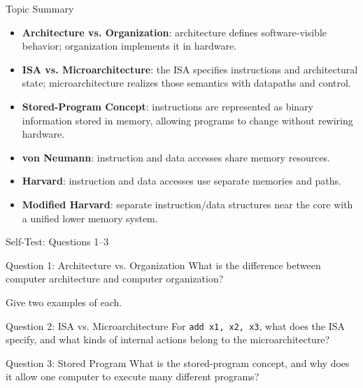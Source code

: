 \documentclass[aspectratio=169,11pt,t]{beamer}
\newcommand{\key}[1]{\textbf{#1}}
\newcommand{\code}[1]{\texttt{#1}}
\begin{document}
\begin{frame}{Topic Summary}

\begin{itemize}
  \item \key{Architecture vs. Organization}:
        architecture defines
        software-visible behavior;
        organization implements it
        in hardware.
  \item \key{ISA vs. Microarchitecture}:
        the ISA specifies instructions
        and architectural state;
        microarchitecture realizes
        those semantics
        with datapaths and control.
  \item \key{Stored-Program Concept}:
        instructions are represented
        as binary information
        stored in memory,
        allowing programs to change
        without rewiring hardware.
  \item \key{von Neumann}:
        instruction and data accesses
        share memory resources.
  \item \key{Harvard}:
        instruction and data accesses
        use separate memories and paths.
  \item \key{Modified Harvard}:
        separate instruction/data structures
        near the core
        with a unified lower memory system.
\end{itemize}

\end{frame}




\begin{frame}{Self-Test: Questions 1--3}

\begin{block}{Question 1: Architecture vs. Organization}
What is the difference
between computer architecture
and computer organization?

Give two examples of each.
\end{block}

\vspace{0.25cm}

\begin{block}{Question 2: ISA vs. Microarchitecture}
For \code{add x1, x2, x3},
what does the ISA specify,
and what kinds of internal actions
belong to the microarchitecture?
\end{block}

\vspace{0.25cm}

\begin{block}{Question 3: Stored Program}
What is the stored-program concept,
and why does it allow one computer
to execute many different programs?
\end{block}

\end{frame}
\end{document}
